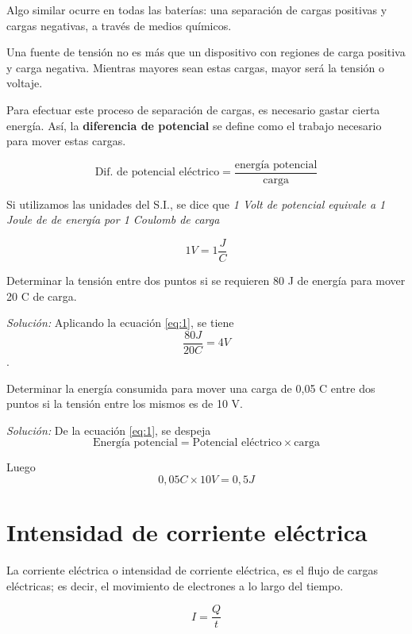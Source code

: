 Algo similar ocurre en todas las baterías: una separación de cargas positivas y cargas negativas, a través de medios químicos.

Una fuente de tensión no es más que un dispositivo con regiones de carga positiva y carga negativa. Mientras mayores sean estas cargas, mayor será la tensión o voltaje.

Para efectuar este proceso de separación de cargas, es necesario gastar cierta energía. Así, la \textbf{diferencia de potencial} se define como el trabajo necesario para mover estas cargas.

\begin{equation} \label{eq:1}
  \text{Dif. de potencial eléctrico} = \frac{\text{energía potencial}}{\text{carga}}
\end{equation}


Si utilizamos las unidades del S.I., se dice que \textit{1 Volt de potencial equivale a 1 Joule de de energía por 1 Coulomb de carga}

$$ 1 V = 1 \frac{J}{C} $$

\begin{ejemplo}
	Determinar la tensión entre dos puntos si se requieren 80 J de energía para mover 20 C de carga.
	
	\emph{Solución:} Aplicando la ecuación \ref{eq:1}, se tiene $$ \frac{80J}{20C}=4V $$.
\end{ejemplo}

\begin{ejemplo}
	Determinar la energía consumida para mover una carga de 0,05 C entre dos puntos si la tensión entre los mismos es de 10 V.
	
	\emph{Solución:} De la ecuación \ref{eq:1}, se despeja $$ \text{Energía potencial} = \text{Potencial eléctrico} \times \text{carga} $$
	
	Luego $$ 0,05C \times 10V = 0,5 J $$
\end{ejemplo}

\section{Intensidad de corriente eléctrica}

La corriente eléctrica o intensidad de corriente eléctrica, es el flujo de cargas eléctricas; es decir, el movimiento de electrones a lo largo del tiempo.

\begin{equation}
\label{eq:2}
	I=\frac{Q}{t}
\end{equation}

